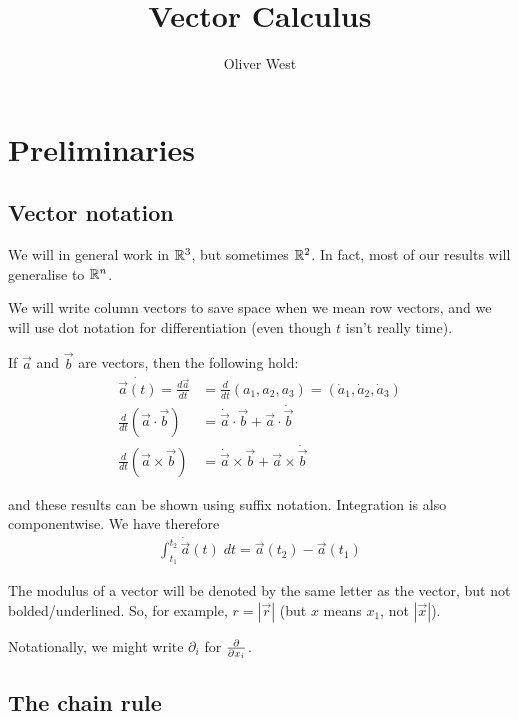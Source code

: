 \documentclass{../../template/note}
\author{Oliver West}
\title{Vector Calculus}
\date{}
\begin{document}
    \maketitle

    \tableofcontents


    \section{Preliminaries}

    \subsection{Vector notation}

    We will in general work in \(\mathbb R^3\), but sometimes \(\mathbb R^2\). In fact, most of our results will generalise to \(\mathbb R^n\).

    We will write column vectors to save space when we mean row vectors, and we will use dot notation for differentiation (even though \(t\) isn't really time).

    If \(\vec a\) and \(\vec b\) are vectors, then the following hold:
    \begin{align}
        \dot{\vec a(t)} = \frac{d \vec a}{dt} &= \frac{d}{dt}(a_1, a_2, a_3) = (\dot a_1, \dot a_2, \dot a_3) \\
        \frac{d}{dt}(\vec a \cdot \vec b) &= \dot {\vec a} \cdot \vec b + \vec a \cdot \dot {\vec b} \\
        \frac{d}{dt}(\vec a \times \vec b) &= \dot {\vec a} \times \vec b + \vec a \times \dot{\vec b}
    \end{align}
    
    and these results can be shown using suffix notation. Integration is also componentwise. We have therefore
    \begin{align*}
        \int_{t_1}^{t_2} \dot {\vec a}(t) \; dt = \vec a(t_2) - \vec a(t_1)
    \end{align*}
    
    The modulus of a vector will be denoted by the same letter as the vector, but not bolded/underlined. So, for example, \(r=|\vec r|\) (but \(x\) means \(x_1\), not \(|\vec x|\)).

    Notationally, we might write \(\partial_i\) for \(\pd {}{x_i}\).

    \subsection{The chain rule}
\end{document}

